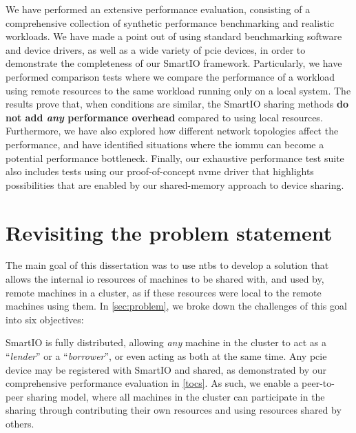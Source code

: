 We have performed an extensive performance evaluation, consisting of a comprehensive collection of synthetic performance benchmarking and realistic workloads.
%
We have made a point out of using standard benchmarking software and device drivers, as well as a wide variety of \gls{pcie} devices, in order to demonstrate the completeness of our SmartIO framework.
%
Particularly, we have performed comparison tests where we compare the performance of a workload using remote resources to the same workload running only on a local system.
%
The results prove that, when conditions are similar, the SmartIO sharing methods \textbf{do not add \emph{any} performance overhead} compared to using local resources.
%
Furthermore, we have also explored how different network topologies affect the performance, and have identified situations where the \gls{iommu} can become a potential performance bottleneck.
%
Finally, our exhaustive performance test suite also includes tests using our proof-of-concept \gls{nvme} driver that highlights possibilities that are enabled by our shared-memory approach to device sharing.






\section{Revisiting the problem statement}\label{sec:discussion}
The main goal of this dissertation was to use \glspl{ntb} to develop a solution that allows the internal \gls{io} resources of machines to be shared with, and used by, remote machines in a cluster, as if these resources were local to the remote machines using them.
%
In \cref{sec:problem}, we broke down the challenges of this goal into six objectives: %






\objdistributed*%
%
%
%
SmartIO is fully distributed, allowing \emph{any} machine in the cluster to act as a ``\emph{\gls{lender}}'' or a ``\emph{\gls{borrower}}'', or even acting as both at the same time.
%
Any \gls{pcie} device may be registered with SmartIO and shared, as demonstrated by our comprehensive performance evaluation in \cref{tocs}.
%
As such, we enable a peer-to-peer sharing model, where all machines in the cluster can participate in the sharing through contributing their own resources and using resources shared by others.


